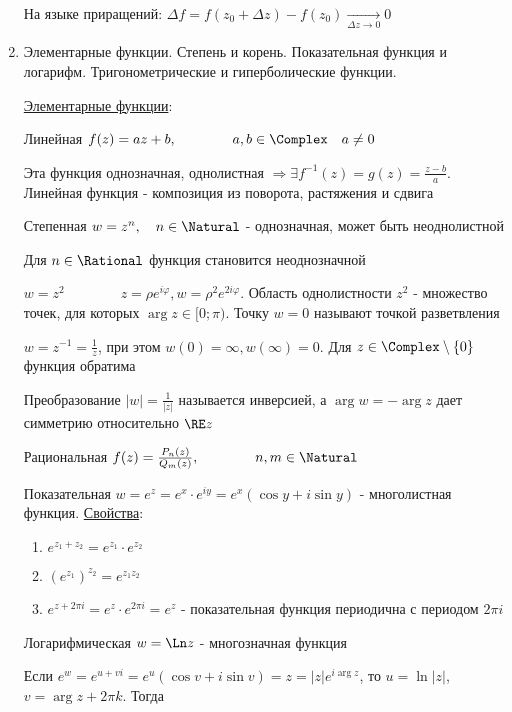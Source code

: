 \begin{enumerate}
    На языке приращений: $\Delta f = f(z_0 + \Delta z) - f(z_0) \underset{\Delta z \to 0}{\longrightarrow} 0$

    \item Элементарные функции. Степень и корень. Показательная функция и логарифм. Тригонометрические и гиперболические функции.

    \hyperlink{elementary_functions}{Элементарные функции}:

     Линейная $f(z) = az + b, \qquad\qquad a, b \in \Complex \quad a \neq 0$

    Эта функция однозначная, однолистная $\Longrightarrow \exists f^{-1}(z) = g(z) = \frac{z - b}{a}$. 
    Линейная функция - композиция из поворота, растяжения и сдвига
    
     Степенная $w = z^n, \quad n \in \Natural$ - однозначная, может быть неоднолистной
    
    Для $n \in \Rational$ функция становится неоднозначной
    
    \Exs $w = z^2 \qquad\qquad z = \rho e^{i\varphi}, w = \rho^2 e^{2i\varphi}$. Область однолистности $z^2$ - множество точек, для которых $\arg z \in [0; \pi)$.
    Точку $w = 0$ называют точкой разветвления
    
    \Exs $w = z^{-1} = \frac{1}{z}$, при этом $w(0) = \infty, w(\infty) = 0$.    
    Для $z \in \Complex \setminus \{0\}$ функция обратима
    
    Преобразование $|w| = \frac{1}{|z|}$ называется инверсией, а $\arg w = -\arg z$ дает симметрию относительно $\RE z$
    
     Рациональная $f(z) = \frac{P_n(z)}{Q_m(z)}, \qquad\qquad n, m \in \Natural$
    
     Показательная $w = e^z = e^x \cdot e^{iy} = e^x (\cos y + i \sin y)$ - многолистная функция. \underline{Свойства}: 
    
    \begin{enumerate}
        \item $e^{z_1 + z_2} = e^{z_1} \cdot e^{z_2}$
        \item $\left(e^{z_1}\right)^{z_2} = e^{z_1 z_2}$
        \item $e^{z + 2\pi i} = e^{z} \cdot e^{2\pi i} = e^z$ - показательная функция периодична с периодом $2\pi i$
    \end{enumerate}
    
     Логарифмическая $w = \Ln z$ - многозначная функция
    
    Если $e^w = e^{u + vi} = e^u (\cos v + i \sin v) = z = |z| e^{i\arg z}$, то $u = \ln |z|$, $v = \arg z + 2\pi k$. Тогда 
    

\end{enumerate}
